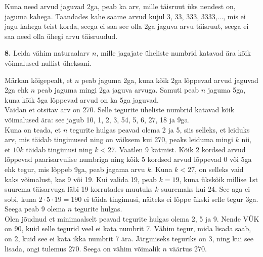 \documentclass[a4paper, 10pt]{article}
\begin{document}
\bigskip
Kuna need arvud jaguvad 2ga, peab ka arv, mille täisruut üks nendest on, jaguma kahega. Taandades kahe saame arvud kujul 3, 33, 333, 3333,..., mis ei jagu kahega teist korda, seega ei saa see olla 2ga jaguva arvu täisruut, seega ei saa need olla ühegi arvu täisruudud.
\bigskip

\noindent\textbf{8.} Leida vähim naturaalarv $n$, mille jagajate üheliste numbrid katavad ära kõik võimalused nullist üheksani.

\bigskip

Märkan kõigepealt, et $n$ peab jaguma 2ga, kuna kõik 2ga lõppevad arvud jaguvad 2ga ehk $n$ peab jaguma mingi 2ga jaguva arvuga. Samuti peab $n$ jaguma 5ga, kuna kõik 5ga lõppevad arvud on ka 5ga jaguvad.\\
Väidan et otsitav arv on 270. Selle tegurite üheliste numbrid katavad kõik võimalused ära: see jagub 10, 1, 2, 3, 54, 5, 6, 27, 18 ja 9ga.\\
Kuna on teada, et $n$ tegurite hulgas peavad olema 2 ja 5, siis selleks, et leiduks arv, mis täidab tingimused ning on väiksem kui 270, peaks leiduma mingi $k$ nii, et $10k$ täidab tingimusi ning $k<27$. Vaatlen 9 katmist. Kõik 2 kordsed arvud lõppevad paarisarvulise numbriga ning kõik 5 kordsed arvud lõppevad 0 või 5ga ehk tegur, mis lõppeb 9ga, peab jagama arvu $k$. Kuna $k<27$, on selleks vaid kaks võimalust, kas 9 või 19. Kui valida 19, peab $k=19$, kuna ükskõik millise 1st suurema täisarvuga läbi 19 korrutades muutuks $k$ suuremaks kui 24. See aga ei sobi, kuna $2\cdot5\cdot19=190$ ei täida tingimusi, näiteks ei lõppe ükski selle tegur 3ga. Seega peab 9 olema $n$ tegurite hulgas.\\
Olen jõudnud et minimaalselt peavad tegurite hulgas olema 2, 5 ja 9. Nende VÜK on 90, kuid selle tegurid veel ei kata numbrit 7. Vähim tegur, mida lisada saab, on 2, kuid see ei kata ikka numbrit 7 ära. Järgmiseks teguriks on 3, ning kui see lisada, ongi tulemus 270. Seega on vähim võimalik $n$ väärtus 270.
\end{document}
